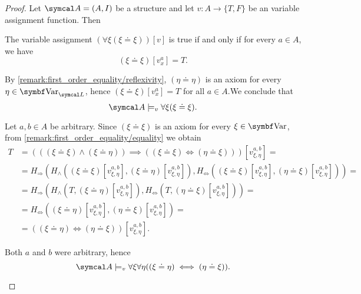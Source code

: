 \begin{proof}
  Let \( \Cal{A} = (A, I) \) be a structure and let \( v: A \to \{ T, F \} \) be an variable assignment function. Then

  \begin{description}
     The variable assignment \( (\forall \xi (\xi \doteq \xi))[v] \) is true if and only if for every \( a \in A \), we have
    \begin{equation*}
      (\xi \doteq \xi)[v_x^a] = T.
    \end{equation*}

    By \cref{remark:first_order_equality/reflexivity}, \( (\eta \doteq \eta) \) is an axiom for every \( \eta \in \Cat{Var}_{\Cal{L}} \), hence \mbox{\( (\xi \doteq \xi)[v_x^a] = T \)} for all \( a \in A \).We conclude that
    \begin{equation*}
      \Cal{A} \models_v \forall \xi (\xi \doteq \xi).
    \end{equation*}

     Let \( a, b \in A \) be arbitrary. Since \( (\xi \doteq \xi) \) is an axiom for every \( \xi \in \Cat{Var} \), from \cref{remark:first_order_equality/equality} we obtain
    \begin{align*}
      T &=
      (((\xi \doteq \xi) \land (\xi \doteq \eta)) \implies ((\xi \doteq \xi) \iff (\eta \doteq \xi)))[v_{\xi,\eta}^{a,b}]
      = \\ &=
      H_\Rightarrow(H_\land((\xi \doteq \xi)[v_{\xi,\eta}^{a,b}], (\xi \doteq \eta)[v_{\xi,\eta}^{a,b}]), H_\Leftrightarrow((\xi \doteq \xi)[v_{\xi,\eta}^{a,b}], (\eta \doteq \xi)[v_{\xi,\eta}^{a,b}]))
      = \\ &=
      H_\Rightarrow(H_\land(T, (\xi \doteq \eta)[v_{\xi,\eta}^{a,b}]), H_\Leftrightarrow(T, (\eta \doteq \xi)[v_{\xi,\eta}^{a,b}]))
      = \\ &=
      H_\Leftrightarrow((\xi \doteq \eta)[v_{\xi,\eta}^{a,b}], (\eta \doteq \xi)[v_{\xi,\eta}^{a,b}])
      = \\ &=
      ((\xi \doteq \eta) \iff (\eta \doteq \xi))[v_{\xi,\eta}^{a,b}].
    \end{align*}

    Both \( a \) and \( b \) were arbitrary, hence
    \begin{equation*}
      \Cal{A} \models_v \forall \xi \forall \eta ((\xi \doteq \eta) \iff (\eta \doteq \xi)).
    \end{equation*}


\end{description}
\end{proof}
